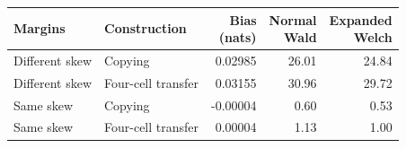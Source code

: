 \begin{tabular}{@{}llrrr@{}}
\toprule
Margins & Construction & \shortstack{Bias\\(nats)} & \shortstack{Normal\\Wald} & \shortstack{Expanded\\Welch}\\
\midrule
Different skew & Copying & 0.02985 & 26.01 & 24.84\\
Different skew & Four-cell transfer & 0.03155 & 30.96 & 29.72\\
Same skew & Copying & -0.00004 & 0.60 & 0.53\\
Same skew & Four-cell transfer & 0.00004 & 1.13 & 1.00\\
\bottomrule
\end{tabular}
